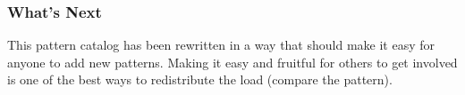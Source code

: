 \subsubsection*{What's Next} This pattern catalog has been rewritten in a way
that should make it easy for anyone to add new patterns. Making it easy
and fruitful for others to get involved is one of the best ways to
redistribute the load (compare
the 
pattern).


